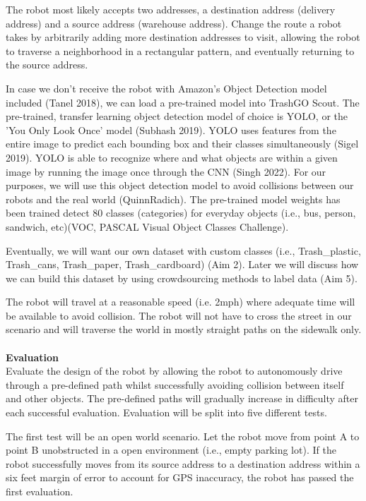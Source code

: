 \documentclass[
  journal=small,
  manuscript=article-type,  %
  year=2022,
  volume=1,
]{cup-journal}
\begin{document}
The robot most likely accepts two addresses, a destination address (delivery address) and a source address (warehouse address). Change the route a robot takes by arbitrarily adding more destination addresses to visit, allowing the robot to traverse a neighborhood in a rectangular pattern, and eventually returning to the source address. 

In case we don't receive the robot with Amazon's Object Detection model included (Tanel 2018), we can load a pre-trained model into TrashGO Scout. The pre-trained, transfer learning object detection model of choice is YOLO, or the 'You Only Look Once' model (Subhash 2019). YOLO uses features from the entire image to predict each bounding box and their classes simultaneously (Sigel 2019). YOLO is able to recognize where and what objects are within a given image by running the image once through the CNN (Singh 2022). For our purposes, we will use this object detection model to avoid collisions between our robots and the real world (QuinnRadich). The pre-trained model weights has been trained detect 80 classes (categories) for everyday objects (i.e., bus, person, sandwich, etc)(VOC, PASCAL Visual Object Classes Challenge). 

Eventually, we will want our own dataset with custom classes (i.e., Trash\_plastic, Trash\_cans, Trash\_paper, Trash\_cardboard) (Aim 2). Later we will discuss how we can build this dataset by using crowdsourcing methods to label data (Aim 5). 

The robot will travel at a reasonable speed (i.e. 2mph) where adequate time will be available to avoid collision. The robot will not have to cross the street in our scenario and will traverse the world in mostly straight paths on the sidewalk only. 
\\\\\textbf{Evaluation}\\
Evaluate the design of the robot by allowing the robot to autonomously drive through a pre-defined path whilst successfully avoiding collision between itself and other objects. The pre-defined paths will gradually increase in difficulty after each successful evaluation. Evaluation will be split into five different tests. 

The first test will be an open world scenario. Let the robot move from point A to point B unobstructed in a open environment (i.e., empty parking lot). If the robot successfully moves from its source address to a destination address within a six feet margin of error to account for GPS inaccuracy, the robot has passed the first evaluation. 
\end{document}
